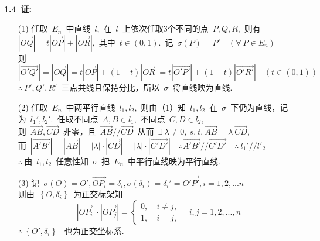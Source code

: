 	
	
	\noindent
	\\
	{\textbf{1.4\ 证:}}
	\begin{itemize}
		\item[(1)]
		任取\ $E_n$\ 中直线\ $l$,\ 在\ $l$\ 上依次任取3个不同的点\ $P,Q,R$,\ 则有\ $\left|\overrightarrow{OQ}\right|=t\left|\overrightarrow{OP}\right|+\left|\overrightarrow{OR}\right|$,\ 其中\ $t\in (0,1)$.\ 记\ $\sigma(P)=P'\quad(\forall\ P\in E_n)$
		\\
		则\ $\left|\overrightarrow{O'Q'}\right|=\left|\overrightarrow{OQ}\right|=t\left|\overrightarrow{OP}\right|+(1-t)\left|\overrightarrow{OR}\right|=t\left|\overrightarrow{O'P'}\right|+(1-t)\left|\overrightarrow{O'R'}\right|\quad (t\in (0,1))$
		\\
		$\therefore\ P',Q',R'$\ 三点共线且保持分比，所以\ $\sigma$\ 将直线映为直线.
		\item[(2)]
		任取\ $E_n$\ 中两平行直线\ $l_1,l_2$,\ 则由（1）知\ $l_1,l_2$\ 在\ $\sigma$\ 下仍为直线，记为\ $l_1',l_2'$.\ 任取不同点\ $A,B\in l_1$,\ 不同点\ $C,D\in l_2$,\ 
		\\
		则\ $\overrightarrow{AB},\overrightarrow{CD}$\ 非零，且\ $\overrightarrow{AB}//\overrightarrow{CD}$\ 从而\ $\exists\ \lambda \neq 0,\ s.\ t.\ \overrightarrow{AB}=\lambda\ \overrightarrow{CD}$,
		\\
		而\ $\left|\overrightarrow{A'B'}\right|=\left|\overrightarrow{AB}\right|=\left| \lambda \right| \cdot \left|\overrightarrow{CD}\right|=\left| \lambda \right| \cdot \left|\overrightarrow{C'D'}\right|\quad\therefore \overrightarrow{A'B'}//\overrightarrow{C'D'}\quad\therefore\ l_1'//l'_2 $ 
		\\
		$\therefore\ $由\ $l_1,l_2$\ 任意性知\ $\sigma$\ 把\ $E_n$\ 中平行直线映为平行直线.
		\item[(3)] 
		记\ $\sigma (O)=O',\overrightarrow{OP_i}=\delta_i,\sigma(\delta_i)=\delta_i'=\overrightarrow{O'P'},i=1,2,...n$
		\\
		则由\ $\left\{O,\delta_i\right\}$\ 为正交标架知
		$$
		\left|\overrightarrow{OP_i}\right|\cdot\left|\overrightarrow{OP_j}\right|=
		\left\{ 
		\begin{array}{ll}
		{0,\ }&i\neq j,
		\\
		1, &i=j,
		\end{array}
		\right.
		\quad i,j=1,2,...,n
		$$
		$\therefore\ 
		\left\{
		O',\delta_i
		\right\}$
		\ 也为正交坐标系.
	\end{itemize}
	
